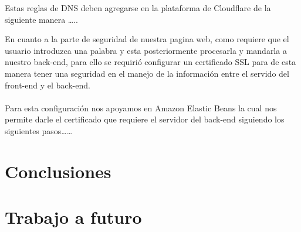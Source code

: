 \documentclass[12pt, a4paper, titlepage]{report}
\begin{document}
Estas reglas de DNS deben agregarse en la plataforma de Cloudflare de la siguiente manera …..


En cuanto a la parte de seguridad de nuestra pagina web, como requiere que el usuario introduzca una palabra y esta posteriormente procesarla y mandarla a nuestro back-end, para ello se requirió configurar un certificado SSL para de esta manera tener una seguridad en el manejo de la información entre el servido del front-end y el back-end.\\\\
Para esta configuración nos apoyamos en Amazon Elastic Beans la cual nos permite darle el certificado que requiere el servidor del back-end siguiendo los siguientes pasos……


\chapter{\textcolor{azulescom}{Conclusiones}}


\newpage

\chapter{\textcolor{azulescom}{Trabajo a futuro}}
\end{document}
